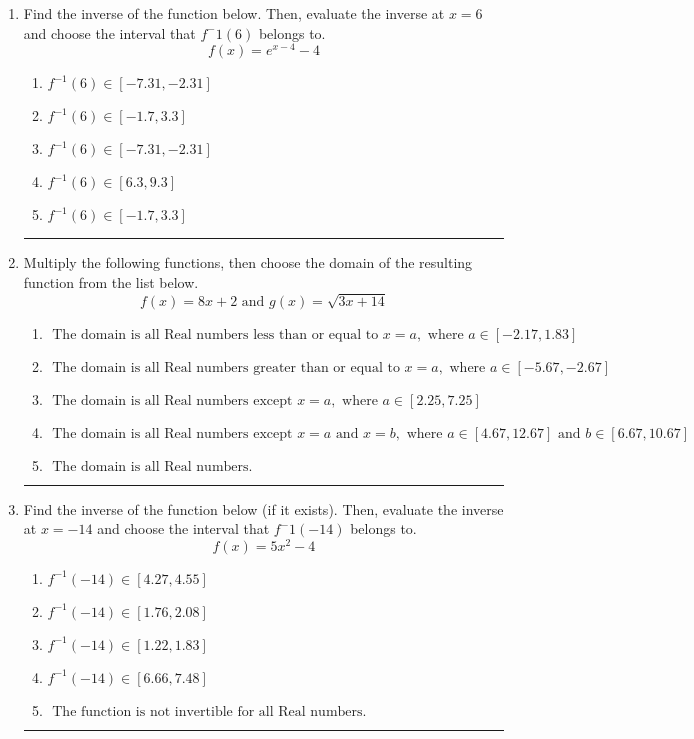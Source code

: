 \documentclass[14pt]{extbook}
\newcommand{\litem}[1]{\item#1\hspace*{-1cm}\rule{\textwidth}{0.4pt}}
\begin{document}
\begin{enumerate}
\litem{
Find the inverse of the function below. Then, evaluate the inverse at $x = 6$ and choose the interval that $f^-1(6)$ belongs to.\[ f(x) = e^{x-4}-4 \]\begin{enumerate}[label=\Alph*.]
\item \( f^{-1}(6) \in [-7.31, -2.31] \)
\item \( f^{-1}(6) \in [-1.7, 3.3] \)
\item \( f^{-1}(6) \in [-7.31, -2.31] \)
\item \( f^{-1}(6) \in [6.3, 9.3] \)
\item \( f^{-1}(6) \in [-1.7, 3.3] \)

\end{enumerate} }
\litem{
Multiply the following functions, then choose the domain of the resulting function from the list below.\[ f(x) = 8x + 2 \text{ and } g(x) = \sqrt{3x+14}  \]\begin{enumerate}[label=\Alph*.]
\item \( \text{ The domain is all Real numbers less than or equal to } x = a, \text{ where } a \in [-2.17, 1.83] \)
\item \( \text{ The domain is all Real numbers greater than or equal to } x = a, \text{ where } a \in [-5.67, -2.67] \)
\item \( \text{ The domain is all Real numbers except } x = a, \text{ where } a \in [2.25, 7.25] \)
\item \( \text{ The domain is all Real numbers except } x = a \text{ and } x = b, \text{ where } a \in [4.67, 12.67] \text{ and } b \in [6.67, 10.67] \)
\item \( \text{ The domain is all Real numbers. } \)

\end{enumerate} }
\litem{
Find the inverse of the function below (if it exists). Then, evaluate the inverse at $x = -14$ and choose the interval that $f^-1(-14)$ belongs to.\[ f(x) = 5 x^2 - 4 \]\begin{enumerate}[label=\Alph*.]
\item \( f^{-1}(-14) \in [4.27, 4.55] \)
\item \( f^{-1}(-14) \in [1.76, 2.08] \)
\item \( f^{-1}(-14) \in [1.22, 1.83] \)
\item \( f^{-1}(-14) \in [6.66, 7.48] \)
\item \( \text{ The function is not invertible for all Real numbers. } \)


\end{enumerate}}
\end{enumerate}
\end{document}
